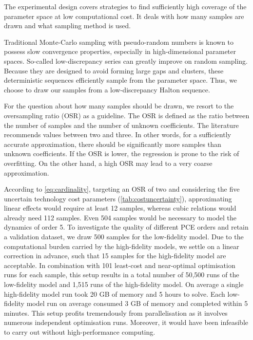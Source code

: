 

The experimental design covers strategies to find sufficiently high coverage of
the parameter space at low computational
cost.\cite{fajraoui_optimal_2017,usher_value_2015} It deals with how many
samples are drawn and what sampling method is used.


Traditional Monte-Carlo sampling with pseudo-random numbers is known to possess
slow convergence properties, %
especially in high-dimensional parameter spaces. So-called low-discrepancy
series can greatly improve on random sampling. Because they are designed to
avoid forming large gaps and clusters, these deterministic sequences efficiently
sample from the parameter space.\cite{fajraoui_optimal_2017} Thus, we choose to
draw our samples from a low-discrepancy Halton sequence.


For the question about how many samples should be drawn, we resort to the
oversampling ratio (OSR) as a guideline. The OSR is defined as the ratio between
the number of samples and the number of unknown
coefficients.\cite{palar_multi-fidelity_2016} The literature recommends values
between two and
three.\cite{hosder2007,palar_multi-fidelity_2016,fajraoui_optimal_2017,gratiet_metamodel-based_2015}
In other words, for a sufficiently accurate approximation, there should be
significantly more samples than unknown coefficients. If the OSR is lower, the
regression is prone to the risk of overfitting. On the other hand, a high OSR
may lead to a very coarse approximation.\cite{palar_multi-fidelity_2016}

According to \cref{eq:cardinality}, targeting an OSR of two and considering the
five uncertain technology cost parameters (\cref{tab:costuncertainty}),
approximating linear effects would require at least 12 samples, whereas cubic
relations would already need 112 samples. Even 504 samples would be necessary to
model the dynamics of order 5. To investigate the quality of different PCE
orders and retain a validation dataset, we draw 500 samples for the low-fidelity
model. Due to the computational burden carried by the high-fidelity models, we
settle on a linear correction in advance, such that 15 samples for the
high-fidelity model are acceptable. In combination with 101 least-cost and
near-optimal optimisation runs for each sample, this setup results in a total
number of 50,500 runs of the low-fidelity model and 1,515 runs of the
high-fidelity model. On average a single high-fidelity model run took 20 GB of
memory and 5 hours to solve. Each low-fidelity model run on average consumed 3
GB of memory and completed within 5 minutes. This setup profits tremendously
from parallelisation as it involves numerous independent optimisation runs.
Moreover, it would have been infeasible to carry out without high-performance
computing.


